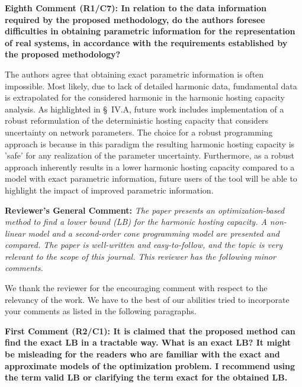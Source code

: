 \documentclass[10pt]{article}
\begin{document}
\textbf{Eighth Comment (R1/C7): In relation to the data information required by the proposed methodology, do the authors foresee difficulties in obtaining parametric information for the representation of real systems, in accordance with the requirements established by the proposed methodology?}

\begin{tcolorbox}[colback=black!5!white,colframe=black]
The authors agree that obtaining exact parametric information is often impossible. Most likely, due to lack of detailed harmonic data, fundamental data is extrapolated for the considered harmonic in the harmonic hosting capacity analysis. As highlighted in \S~IV.A, future work includes implementation of a robust reformulation of the deterministic hosting capacity that considers uncertainty on network parameters. The choice for a robust programming approach is because in this paradigm the resulting harmonic hosting capacity is 'safe' for any realization of the parameter uncertainty. Furthermore, as a robust approach inherently results in a lower harmonic hosting capacity compared to a model with exact parametric information, future users of the tool will be able to highlight the impact of improved parametric information.

\end{tcolorbox}

\newpage


\textbf{Reviewer's General Comment:} \newline \textit{The paper presents an optimization-based method to find a lower bound (LB) for the harmonic hosting capacity. A non-linear model and a second-order cone programming model are presented and compared. The paper is well-written and easy-to-follow, and the topic is very relevant to the scope of this journal. This reviewer has the following minor comments.} 

\begin{tcolorbox}[colback=black!5!white,colframe=black]
We thank the reviewer for the encouraging comment with respect to the relevancy of the work. We have to the best of our abilities tried to incorporate your comments as listed in the following paragraphs.
\end{tcolorbox}

\textbf{First Comment (R2/C1): It is claimed that the proposed method can find the exact LB in a tractable way. What is an exact LB? It might be misleading for the readers who are familiar with the exact and approximate models of the optimization problem. I recommend using the term valid LB or clarifying the term exact for the obtained LB.}
\end{document}
